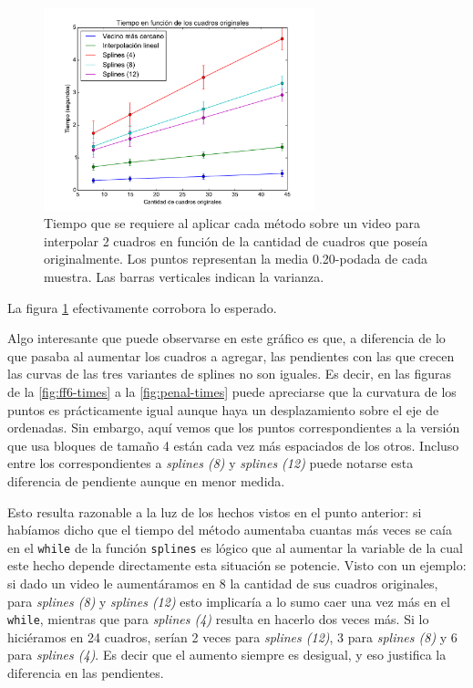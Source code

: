 \begin{figure}[H]
 \centering
	\includegraphics[width=0.7\textwidth]{imgs/resultados_tiempos/ff6_times_cuadros.pdf}
	\caption{\footnotesize Tiempo que se requiere al aplicar cada método sobre un video para interpolar 2 cuadros en función de la cantidad de cuadros que poseía originalmente. Los puntos representan la media 0.20-podada de cada muestra. Las barras verticales indican la varianza.}
	\label{fig:ff6-times-cuadros}
\end{figure}

La figura \ref{fig:ff6-times-cuadros} efectivamente corrobora lo esperado. 

Algo interesante que puede observarse en este gráfico es que, a diferencia de lo que pasaba al aumentar los cuadros a agregar, las pendientes con las que crecen las curvas de las tres variantes de splines no son iguales. Es decir, en las figuras de la \ref{fig:ff6-times} a la \ref{fig:penal-times} puede apreciarse que la curvatura de los puntos es prácticamente igual aunque haya un desplazamiento sobre el eje de ordenadas. Sin embargo, aquí vemos que los puntos correspondientes a la versión que usa bloques de tamaño 4 están cada vez más espaciados de los otros. Incluso entre los correspondientes a \emph{splines (8)} y \emph{splines (12)} puede notarse esta diferencia de pendiente aunque en menor medida.

Esto resulta razonable a la luz de los hechos vistos en el punto anterior: si habíamos dicho que el tiempo del método aumentaba cuantas más veces se caía en el \texttt{while} de la función \texttt{splines} es lógico que al aumentar la variable de la cual este hecho depende directamente esta situación se potencie. Visto con un ejemplo: si dado un video le aumentáramos en 8 la cantidad de sus cuadros originales, para \emph{splines (8)} y \emph{splines (12)} esto implicaría a lo sumo caer una vez más en el \texttt{while}, mientras que para \emph{splines (4)} resulta en hacerlo dos veces más. Si lo hiciéramos en 24 cuadros, serían 2 veces para \emph{splines (12)}, 3 para \emph{splines (8)} y 6 para \emph{splines (4)}. Es decir que el aumento siempre es desigual, y eso justifica la diferencia en las pendientes.

